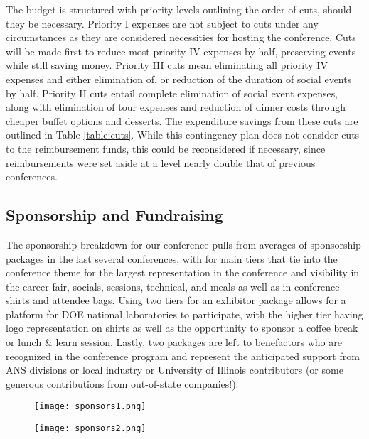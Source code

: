 The budget is structured with priority levels outlining the order of cuts, should they be necessary. Priority I expenses are not subject to cuts under any circumstances as they are considered necessities for hosting the conference. Cuts will be made first to reduce most priority IV expenses by half, preserving events while still saving money. Priority III cuts mean eliminating all priority IV expenses and either elimination of, or reduction of the duration of social events by half. Priority II cuts entail complete elimination of social event expenses, along with elimination of tour expenses and reduction of dinner costs through cheaper buffet options and desserts. The expenditure savings from these cuts are outlined in Table \ref{table:cuts}. While this contingency plan does not consider cuts to the reimbursement funds, this could be reconsidered if necessary, since reimbursements were set aside at a level nearly double that of previous conferences. 

\subsection{Sponsorship and Fundraising}
The sponsorship breakdown for our conference pulls from averages of sponsorship packages in the last several conferences, with for main tiers that tie into the conference theme for the largest representation in the conference and visibility in the career fair, socials, sessions, technical, and meals as well as in conference shirts and attendee bags. Using two tiers for an exhibitor package allows for a platform for DOE national laboratories to participate, with the higher tier having logo representation on shirts as well as the opportunity to sponsor a coffee break or lunch \& learn session. Lastly, two packages are left to benefactors who are recognized in the conference program and represent the anticipated support from ANS divisions or local industry or University of Illinois contributors (or some generous contributions from out-of-state companies!). 


\begin{figure}[H]
	\centering
	\texttt{[image: sponsors1.png]}	
\end{figure} 

\begin{figure}[H]
	\centering
	\texttt{[image: sponsors2.png]}	
\end{figure} 

